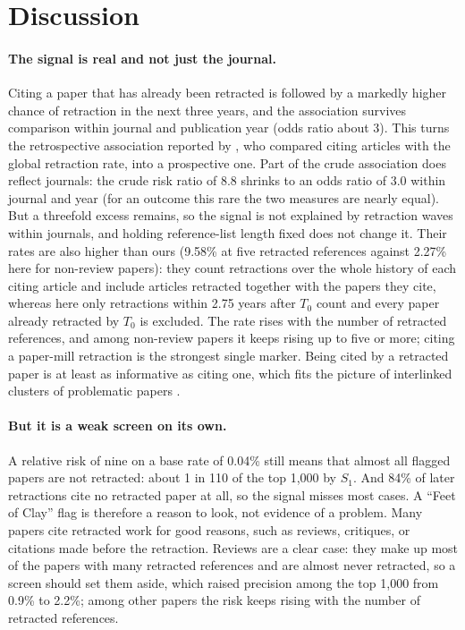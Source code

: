 \section{Discussion}\label{sec:discussion}

\paragraph{The signal is real and not just the journal.} Citing a paper that has already been retracted is followed by a
markedly higher chance of retraction in the next three years, and the association survives comparison within journal
and publication year (odds ratio about 3). This turns the retrospective association reported by
\citet{lou2026beyond}, who compared citing articles with the global retraction rate, into a prospective one. Part of
the crude association does reflect journals: the crude risk ratio of 8.8 shrinks to an odds ratio of 3.0 within journal
and year (for an outcome this rare the two measures are nearly equal). But a threefold excess remains, so the signal is not explained by retraction waves within journals, and holding
reference-list length fixed does not change it. Their rates are also higher than ours (9.58\% at five retracted
references against 2.27\% here for non-review papers): they count retractions over the whole history of each citing
article and include articles retracted together with the papers they cite, whereas here only retractions within 2.75
years after $T_0$ count and every paper already retracted by $T_0$ is excluded.
The rate rises with the number of retracted references, and among non-review papers it keeps rising up to five or
more; citing a paper-mill retraction is the strongest single marker. Being cited by a retracted paper is at least as informative as citing one, which fits the
picture of interlinked clusters of problematic papers \citep{candal2024references}.

\paragraph{But it is a weak screen on its own.} A relative risk of nine on a base rate of 0.04\% still means that almost
all flagged papers are not retracted: about 1 in 110 of the top 1,000 by $S_1$. And 84\% of later retractions cite no
retracted paper at all, so the signal misses most cases. A ``Feet of Clay'' flag is therefore a reason to look, not
evidence of a problem. Many papers cite retracted work for good reasons, such as reviews, critiques, or citations made
before the retraction. Reviews are a clear case: they make up most of the papers with many retracted references and are almost
never retracted, so a screen should set them aside, which raised precision among the top 1,000 from 0.9\% to 2.2\%; among other papers the risk keeps rising with the number of
retracted references.

